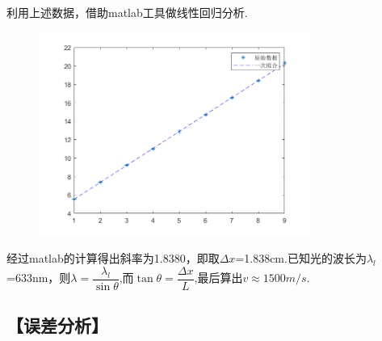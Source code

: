 \documentclass[12pt,a4paper,UTF8]{ctexart}
\begin{document}
		利用上述数据，借助matlab工具做线性回归分析.\par
		
		\begin{figure}[htbp]
		\centering
		\includegraphics[width=3.5in]{water.png}
		\end{figure}
		
		经过matlab的计算得出斜率为1.8380，即取$\Delta x$=1.838cm.已知光的波长为$\lambda_l$=633nm，则$\lambda=\dfrac{\lambda_l}{\sin\theta}$,而$\tan\theta=\dfrac{\Delta x}{L}$,最后算出$v\approx 1500m/s$.

\subsection*{【误差分析】}
\end{document}
